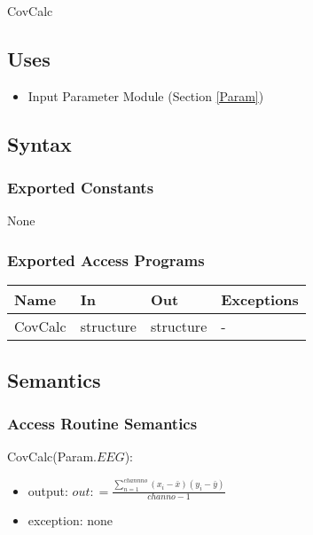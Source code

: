 \documentclass[12pt, titlepage]{article}
\begin{document}
CovCalc

\subsection{Uses}

\begin{itemize}
\item Input Parameter Module (Section \ref{Param})
\end{itemize}


\subsection{Syntax}

\subsubsection{Exported Constants}
None

\subsubsection{Exported Access Programs}

\begin{center}
\begin{tabular}{p{2cm} p{4cm} p{4cm} p{2cm}}
\hline
\textbf{Name} & \textbf{In} & \textbf{Out} & \textbf{Exceptions} \\
\hline
CovCalc & structure & structure & - \\
\hline
\end{tabular}
\end{center}

\subsection{Semantics}

\subsubsection{Access Routine Semantics}

CovCalc(Param.$EEG$):
\begin{itemize}
\item output: $out : = \frac {\sum_{n=1}^{channno} (x_i - \bar{x})(y_i - \bar{y})} {channo - 1}$ 
\item exception: none
\end{itemize}


~\newpage
\end{document}

